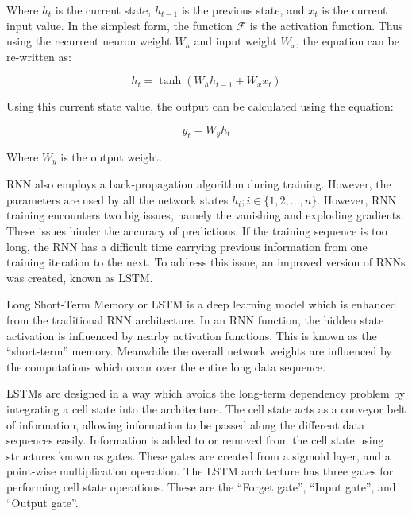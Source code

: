 Where $h_{t}$ is the current state, $h_{t-1}$ is the previous state, and $x_{t}$ is the current input value. In the simplest form, the function $\mathcal{F}$ is the activation function. Thus using the recurrent neuron weight $W_{h}$ and input weight $W_{x}$, the equation can be re-written as:

\begin{equation}
    h_{t} = \tanh(W_{h}h_{t-1} + W_{x}x_{t})
\end{equation}

Using this current state value, the output can be calculated using the equation:

\begin{equation}
    y_{t} = W_{y}h_{t}
\end{equation}

Where $W_{y}$ is the output weight.\par

RNN also employs a back-propagation algorithm during training. However, the parameters are used by all the network states $h_{i}; i \in \{1, 2, ... , n\}$. However, RNN training encounters two big issues, namely the vanishing and exploding gradients. These issues hinder the accuracy of predictions. If the training sequence is too long, the RNN has a difficult time carrying previous information from one training iteration to the next. To address this issue, an improved version of RNNs was created, known as LSTM.\par

Long Short-Term Memory or LSTM is a deep learning model which is enhanced from the traditional RNN architecture. In an RNN function, the hidden state activation is influenced by nearby activation functions. This is known as the ``short-term'' memory. Meanwhile the overall network weights are influenced by the computations which occur over the entire long data sequence.\par


LSTMs are designed in a way which avoids the long-term dependency problem by integrating a cell state into the architecture. The cell state acts as a conveyor belt of information, allowing information to be passed along the different data sequences easily. Information is added to or removed from the cell state using structures known as gates. These gates are created from a sigmoid layer, and a point-wise multiplication operation. The LSTM architecture has three gates for performing cell state operations. These are the ``Forget gate'', ``Input gate'', and ``Output gate''.\par

